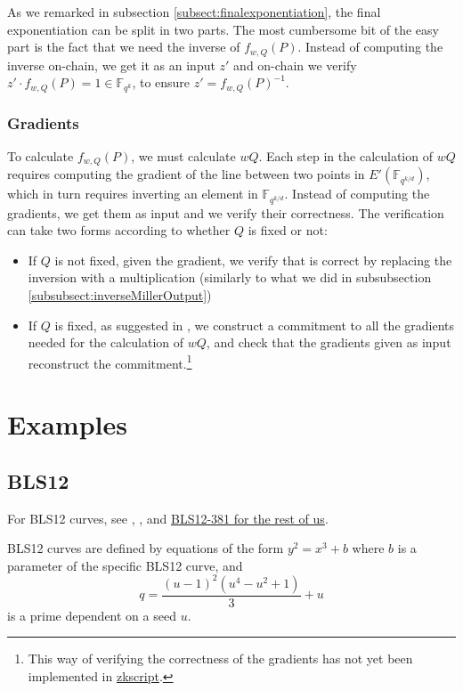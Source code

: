 \documentclass{article}
\newcommand{\fq}[1]{\mathbb{F}_{q^{#1}}}
\theoremstyle{remark}
\theoremstyle{plain}
\begin{document}
As we remarked in subsection \ref{subsect:finalexponentiation}, the final exponentiation can be split in two parts.
The most cumbersome bit of the easy part is the fact that we need the inverse of $f_{w,Q}(P)$.
Instead of computing the inverse on-chain, we get it as an input $z'$ and on-chain we verify $z' \cdot f_{w,Q}(P) = 1 \in \fq{k}$, to ensure $z' = f_{w,Q}(P)^{-1}$.

\subsubsection{Gradients}

To calculate $f_{w,Q}(P)$, we must calculate $w Q$.
Each step in the calculation of $wQ$ requires computing the gradient of the line between two points in $E'(\fq{k/d})$, which in turn requires inverting an element in $\fq{k/d}$.
Instead of computing the gradients, we get them as input and we verify their correctness.
The verification can take two forms according to whether $Q$ is fixed or not:
\begin{itemize}
    \item If $Q$ is not fixed, given the gradient, we verify that is correct by replacing the inversion with a multiplication (similarly to what we did in subsubsection \ref{subsubsect:inverseMillerOutput})
    \item If $Q$ is fixed, as suggested in \cite{NE-on-proving-pairings}, we construct a commitment to all the gradients needed for the calculation of $wQ$, and check that the gradients given as input reconstruct the commitment.\footnote{This way of verifying the correctness of the gradients has not yet been implemented in \href{https://github.com/nchain-innovation/zkscript_package}{zkscript}.}
\end{itemize}

\section{Examples}

\subsection{BLS12}

For BLS12 curves, see \cite{BLS-curves-with-prescribed-emb-degree}, \cite{FST-taxonomy}, and \href{https://hackmd.io/@benjaminion/bls12-381}{BLS12-381 for the rest of us}.

BLS12 curves are defined by equations of the form $y^2 = x^3 + b$ where $b$ is a parameter of the specific BLS12 curve, and
\[
    q = \frac{(u-1)^2 (u^4 - u^2 + 1)}{3} + u
\]
is a prime dependent on a seed $u$.
\end{document}
